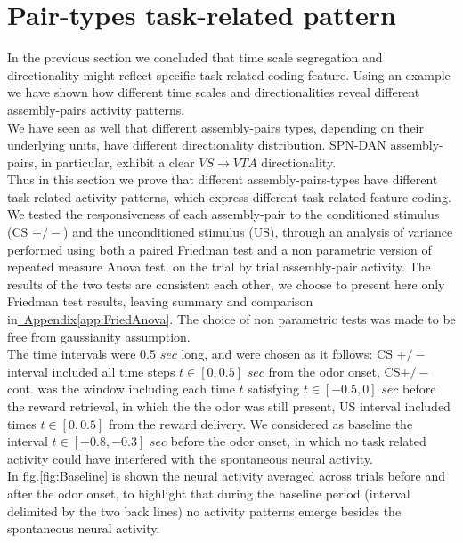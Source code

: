  \section{Pair-types task-related pattern}
 \label{sec:TaskResp}
In the previous section we concluded that time scale segregation and directionality might reflect specific task-related coding feature. Using an example we have shown how different time scales and directionalities reveal different assembly-pairs activity patterns.\\We have seen as well that different assembly-pairs types, depending on their underlying units, have different directionality distribution. SPN-DAN assembly-pairs, in particular, exhibit a clear $VS\rightarrow VTA$ directionality.\\Thus in this section we prove that different assembly-pairs-types have different task-related activity patterns, which express different task-related feature coding.\\
We tested the responsiveness of each assembly-pair to the conditioned stimulus (CS $+/-$) and the unconditioned stimulus (US), through an analysis of variance performed using both a paired Friedman test and a non parametric version of repeated measure Anova test, on the trial by trial assembly-pair activity. The results of the two tests are consistent each other, we choose to present here only Friedman test results, leaving summary and comparison in\hyperref[app:FriedAnova]{~Appendix\ref*{app:FriedAnova}}. The choice of non parametric tests was made to be free from gaussianity assumption.\\The time intervals were 0.5 $sec$ long, and were chosen as it follows: CS $+/-$ interval included all time steps $t \in [0, 0.5]$ $sec$ from the odor onset, CS$+/-$cont. was the window including each time $t$ satisfying $t \in [-0.5, 0]$ $sec$ before the reward retrieval, in which the the odor was still present, US interval included times $t \in [0,0.5]$ from the reward delivery. We considered as baseline the interval $t \in [-0.8, -0.3]$ $sec$ before the odor onset, in which no task related activity could have interfered with the spontaneous neural activity.\\In fig.\ref{fig:Baseline} is shown the neural activity averaged across trials before and after the odor onset, to highlight that during the baseline period (interval delimited by the two back lines) no activity patterns emerge besides the spontaneous neural activity.\\
